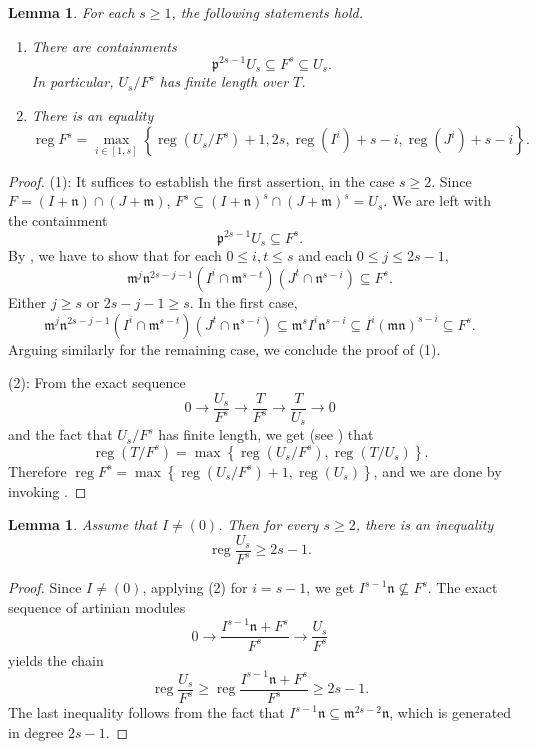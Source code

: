 \documentclass{amsart}
\DeclareMathOperator{\reg}{reg}
\newcommand{\mm}{\mathfrak{m}}
\newcommand{\nn}{\mathfrak{n}}
\newcommand{\pp}{\mathfrak{p}}
\theoremstyle{plain}
\newtheorem{lem}[thm]{Lemma}
\theoremstyle{definition}
\numberwithin{equation}{section}
\begin{document}
\begin{lem}
\label{lem_finitelength}
For each $s\ge 1$, the following statements hold.
\begin{enumerate}[\quad \rm (1)]
 \item There are containments 
$$
\pp^{2s-1}U_s \subseteq F^s\subseteq U_s.
$$
In particular, $U_s/F^s$ has finite length over $T$.
\item There is an equality
\[
\reg F^s= \max_{i\in [1,s]} \left\{\reg(U_s/F^s)+1, 2s, \reg(I^i)+s-i, \reg(J^i)+s-i\right\}.
\]
\end{enumerate}
\end{lem}
\begin{proof}
(1): It suffices to establish the first assertion, in the case $s\ge 2$. Since $F=(I+\nn)\cap (J+\mm)$, $F^s\subseteq (I+\nn)^s\cap (J+\mm)^s=U_s$. We are left with the containment
\[
 \pp^{2s-1}U_s \subseteq F^s.
\]
By , we have to show that for each $0\le i,t\le s$ and each $0\le j\le 2s-1$, 
\[
\mm^j\nn^{2s-j-1}(I^i\cap \mm^{s-t})(J^t\cap \nn^{s-i})\subseteq F^s.
\]
Either $j\ge s$ or $2s-j-1\ge s$. In the first case,
\[
\mm^j\nn^{2s-j-1}(I^i\cap \mm^{s-t})(J^t\cap \nn^{s-i}) \subseteq \mm^s I^i\nn^{s-i} \subseteq I^i(\mm\nn)^{s-i} \subseteq F^s.
\]
Arguing similarly for the remaining case, we conclude the proof of (1).

(2): From the exact sequence
\[
0\to \frac{U_s}{F^s} \to \frac{T}{F^s} \to \frac{T}{U_s} \to 0
\]
and the fact that $U_s/F^s$ has finite length, we get (see \cite[Corollary 20.19]{Eis95}) that
\[
\reg(T/F^s)=\max \left\{\reg(U_s/F^s),\reg(T/U_s) \right\}.
\]
Therefore $\reg F^s=\max \left\{\reg(U_s/F^s)+1,\reg(U_s) \right\}$, and we are done by invoking .
\end{proof}


\begin{lem}
\label{lem_regUsmodeFs_ge2sminus1}
Assume that $I\neq (0)$. Then for every $s\ge 2$, there is an inequality 
\[
\reg \frac{U_s}{F^s} \ge 2s-1.
\]
\end{lem}
\begin{proof}
Since $I\neq (0)$, applying (2) for $i=s-1$, we get $I^{s-1}\nn \not\subseteq F^s$. The exact sequence of artinian modules
\[
0\to \frac{I^{s-1}\nn +F^s}{F^s} \to \frac{U_s}{F^s}
\]
yields the chain
\[
\reg  \frac{U_s}{F^s} \ge \reg \frac{I^{s-1}\nn +F^s}{F^s} \ge 2s-1.
\]
The last inequality follows from the fact that $I^{s-1}\nn \subseteq \mm^{2s-2}\nn$, which is generated in degree $2s-1$.
\end{proof}
\end{document}
